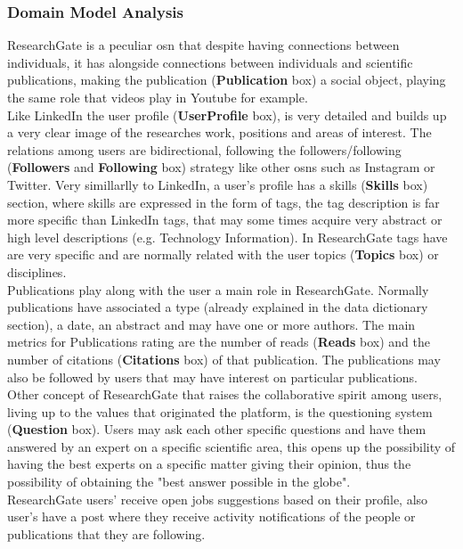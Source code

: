 \subsubsection*{Domain Model Analysis}
ResearchGate is a peculiar \gls{osn} that despite having connections between individuals, it has alongside connections between individuals and scientific publications,
making the publication (\textbf{Publication} box) a social object, playing the same role that videos play in Youtube for example.\\
\indent Like LinkedIn the user profile (\textbf{UserProfile} box), is very detailed and builds up a very clear image of the researches work, positions and areas of interest. The relations
among users are bidirectional, following the followers/following (\textbf{Followers} and \textbf{Following} box) strategy like other \glspl{osn} such as Instagram or Twitter. Very simillarlly to LinkedIn, a
user's profile has a skills (\textbf{Skills} box) section, where skills are expressed in the form of tags, the tag description is far more specific than LinkedIn tags, that may some
times acquire very abstract or high level descriptions (e.g. Technology Information). In ResearchGate tags have are very specific and are
normally related with the user topics (\textbf{Topics} box) or disciplines.\\
\indent Publications play along with the user a main role in ResearchGate. Normally publications have associated a type (already explained in the data dictionary section), a date, an abstract and may have one or more authors. The main metrics for Publications rating are the number of reads (\textbf{Reads} box) and the number of
citations (\textbf{Citations} box) of that publication. The publications may also be followed by users that may have interest on particular publications.\\
\indent Other concept of ResearchGate that raises the collaborative spirit among users, living up to the values that originated the platform, is the questioning system
(\textbf{Question} box). Users may ask each other specific questions and have them answered by an expert on a specific scientific area, this opens up the possibility of having
the best experts on a specific matter giving their opinion, thus the possibility of obtaining the "best answer possible in the globe".\\
\indent ResearchGate users' receive open jobs suggestions based on their profile, also user's have a post where they receive activity notifications of the people
or publications that they are following.

